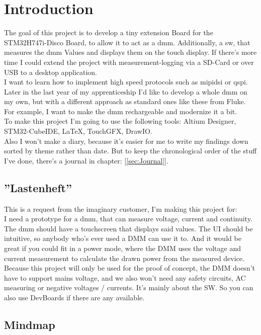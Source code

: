 \chapter{Introduction}
\label{cha:Introduction}


The goal of this project is to develop a tiny extension Board for the STM32H747i-Disco Board, to allow it to act as a \acs{dmm}. Additionally, a \acs{sw}, that measures the \acs{dmm} Values and displays them on the touch display. If there's more time I could extend the project with measurement-logging via a SD-Card or over USB to a desktop application.
\\
I want to learn how to implement high speed protocols such as \acs{mipidsi} or \acs{qspi}. Later in the last year of my apprenticeship I'd like to develop a whole \acs{dmm} on my own, but with a different approach as standard ones like these from Fluke. For example, I want to make the \acs{dmm} rechargeable and modernize it a bit. 
\\
To make this project I'm going to use the following tools: Altium Designer, STM32-CubeIDE, LaTeX, TouchGFX, DrawIO.
\\
Also I won't make a diary, because it's easier for me to write my findings down sorted by theme rather than date. But to keep the chronological order of the stuff I've done, there's a journal in chapter: [\ref{sec:Journal}].

\section{''Lastenheft''}
\label{sec:Lastenheft}
This is a request from the imaginary customer, I'm making this project for:
\\
I need a prototype for a \acs{dmm}, that can measure voltage, current and continuity. The \acs{dmm} should have a touchscreen that displays said values. The UI should be intuitive, so anybody who's ever used a DMM can use it to. And it would be great if you could fit in a power mode, where the DMM uses the voltage and current measurement to calculate the drawn power from the measured device. Because this project will only be used for the proof of concept, the DMM doesn't have to support mains voltage, and we also won't need any safety circuits, AC measuring or negative voltages / currents. It's mainly about the SW. So you can also use DevBoards if there are any available. 

\newpage

\section{Mindmap}
\label{sec:Mindmap}

